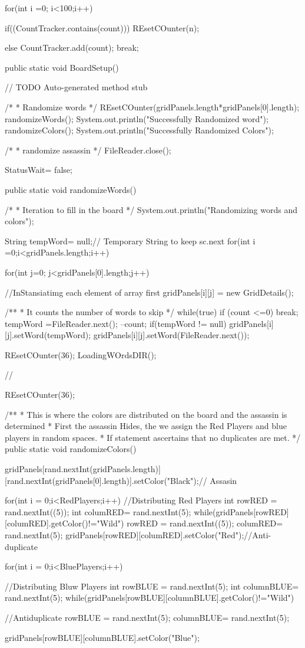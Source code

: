 {{	for(int i =0; i<100;i++) {
		if((CountTracker.contains(count))) {
			REsetCOunter(n);
		}
			
		else
	CountTracker.add(count);
		break;
	}


	}


	public static void BoardSetup() {
		// TODO Auto-generated method stub
		
		/*
		 * Randomize words
		 */
		REsetCOunter(gridPanels.length*gridPanels[0].length);
		randomizeWords();
		System.out.println("Successfully Randomized word");
		randomizeColors();
		System.out.println("Successfully Randomized Colors");

		/*
		 * randomize assassin
		 */
FileReader.close();


		StatusWait= false;
	}
	public static  void  randomizeWords() 
	{	
			/*
			 * Iteration to fill in the board
			 */
		System.out.println("Randomizing words and colors");
			
			String tempWord= null;// Temporary String to keep sc.next
			for(int i =0;i<gridPanels.length;i++)
			{
				for(int j=0; j<gridPanels[0].length;j++)
				{
				
				//InStansiatimg each element of array first	
				gridPanels[i][j] = new GridDetails();
				
				/**
				 * It counts the number of words to skip
				 */
				while(true) 
				{
					if (count <=0)
						break;
					tempWord =FileReader.next();
					--count;
				}
				if(tempWord != null)
				gridPanels[i][j].setWord(tempWord);
				gridPanels[i][j].setWord(FileReader.next());
				
				

				REsetCOunter(36);
				LoadingWOrdsDIR();
			
				
				
				//}REsetCOunter(36);


			}
			}
	}
/**
 * This is where the colors are distributed on the board and the assassin is determined
 * First the assassin Hides, the we assign the Red Players and blue players in random spaces.
 * If statement ascertains that no duplicates are met.
 */
	public static void  randomizeColors() 
	{
		gridPanels[rand.nextInt(gridPanels.length)][rand.nextInt(gridPanels[0].length)].setColor("Black");// Assasin
		
		for(int i = 0;i<RedPlayers;i++) {//Distributing Red Players
		int	rowRED = rand.nextInt((5));
		int columRED= rand.nextInt(5);
			while(gridPanels[rowRED][columRED].getColor()!="Wild") {
				rowRED = rand.nextInt((5));
				columRED= rand.nextInt(5);
			}gridPanels[rowRED][columRED].setColor("Red");}//Anti-duplicate
					
					
		for(int i = 0;i<BluePlayers;i++) {//Distributing Bluw Players
			int	rowBLUE = rand.nextInt(5);
			int columnBLUE= rand.nextInt(5);
				while(gridPanels[rowBLUE][columnBLUE].getColor()!="Wild") {//Antiduplicate
					rowBLUE = rand.nextInt(5);
					columnBLUE= rand.nextInt(5);
						
			}gridPanels[rowBLUE][columnBLUE].setColor("Blue");
				
		}
		
		
		
		
		
	}
	

